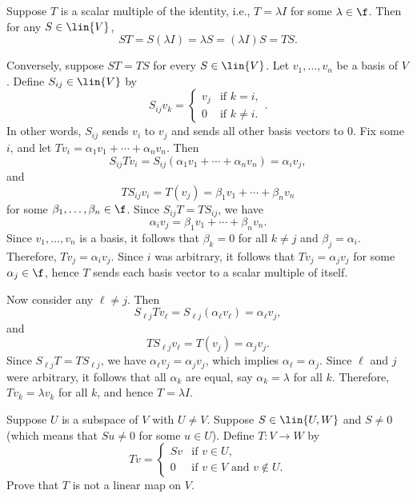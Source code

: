 \begin{sol}
    Suppose $T$ is a scalar multiple of the identity, i.e., $T = \lambda I$ for some $\lambda \in \f$. Then for any $S \in \lin{V}$,
    \[ST = S(\lambda I) = \lambda S = (\lambda I)S = TS.\]

    Conversely, suppose $ST = TS$ for every $S \in \lin{V}$. Let $v_1, \ldots, v_n$ be a basis of $V$. Define $S_{ij} \in \lin{V}$ by
    \[S_{ij}v_k = 
    \begin{cases}
        v_j & \text{if } k = i, \\
        0 & \text{if } k \neq i.
    \end{cases}.\]
    In other words, $S_{ij}$ sends $v_i$ to $v_j$ and sends all other basis vectors to $0$. Fix some $i$, and let $Tv_i = \alpha_1 v_1 + \cdots + \alpha_n v_n$. Then
    \[S_{ij}Tv_i = S_{ij}(\alpha_1 v_1 + \cdots + \alpha_n v_n) = \alpha_i v_j,\]
    and
    \[TS_{ij}v_i = T(v_j) = \beta_1 v_1 + \cdots + \beta_n v_n\]
    for some $\beta_1, \ldots, \beta_n \in \f$. Since $S_{ij}T = TS_{ij}$, we have
    \[\alpha_i v_j = \beta_1 v_1 + \cdots + \beta_n v_n.\]
    Since $v_1, \ldots, v_n$ is a basis, it follows that $\beta_k = 0$ for all $k \neq j$ and $\beta_j = \alpha_i$. Therefore, $Tv_j = \alpha_i v_j$. Since $i$ was arbitrary, it follows that $Tv_j = \alpha_j v_j$ for some $\alpha_j \in \f$, hence $T$ sends each basis vector to a scalar multiple of itself.

    Now consider any $\ell \neq j$. Then
    \[S_{\ell j}Tv_\ell = S_{\ell j}(\alpha_\ell v_\ell) = \alpha_\ell v_j,\]
    and
    \[TS_{\ell j}v_\ell = T(v_j) = \alpha_j v_j.\]
    Since $S_{\ell j}T = TS_{\ell j}$, we have $\alpha_\ell v_j = \alpha_j v_j$, which implies $\alpha_\ell = \alpha_j$. Since $\ell$ and $j$ were arbitrary, it follows that all $\alpha_k$ are equal, say $\alpha_k = \lambda$ for all $k$. Therefore, $Tv_k = \lambda v_k$ for all $k$, and hence $T = \lambda I$.
\end{sol}

\begin{exercise}[3a12]
    Suppose $U$ is a subspace of $V$ with $U \neq V$. Suppose $S \in \lin{U, W}$ and $S \neq 0$ (which means that $Su \neq 0$ for some $u \in U$). Define $T: V \to W$ by
    \[Tv = 
    \begin{cases}
        Sv & \text{if } v \in U, \\
        0 & \text{if } v \in V \text{ and } v \notin U. 
    \end{cases}
    \]
    Prove that $T$ is not a linear map on $V$.
\end{exercise}

